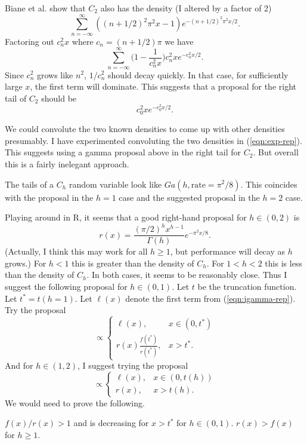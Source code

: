 \documentclass[12pt]{article}
\begin{document}
Biane et al. show that $C_2$ also has the density (I altered by a factor of 2)
\[
\sum_{n=-\infty}^{\infty} ((n+1/2)^2 \pi^2 x - 1) e^{-(n+1/2)^2
  \pi^2 x / 2}.
\]
Factoring out $c_n^2 x$ where $c_n = (n+1/2) \pi$ we have
\[
\sum_{n=-\infty}^\infty \Big( 1 - \frac{1}{c_n^2 x} \Big) c_n^2 x
e^{-c_n^2 x / 2}.
\]
Since $c_n^2$ grows like $n^2$, $1/c_n^2$ should decay quickly.  In that case,
for sufficiently large $x$, the first term will dominate.  This suggests that a
proposal for the right tail of $C_2$ should be
\[
c_0^2 x e^{-c_0^2 x / 2}.
\]

\begin{remark}
  We could convolute the two known densities to come up with other densities
  presumably.  I have experimented convoluting the two densities in
  (\ref{eqn:exp-rep}).  This suggests using a gamma proposal above in the right
  tail for $C_2$.  But overall this is a fairly inelegant approach.
\end{remark}

\begin{conjecture}
  The tails of a $C_h$ random variable look like $Ga(h, \text{rate}=\pi^2 / 8)$.
  This coincides with the proposal in the $h=1$ case and the suggested proposal
  in the $h=2$ case.
\end{conjecture}

Playing around in R, it seems that a good right-hand proposal for $h \in (0,2)$
is
\[
r(x) = \frac{(\pi/2)^h x^{h-1}}{\Gamma(h)} e^{-\pi^2 x / 8}.
\]
(Actually, I think this may work for all $h \geq 1$, but performance will decay
as $h$ grows.)  For $h < 1$ this is greater than the density of $C_h$.  For $1 <
h < 2$ this is less than the density of $C_h$.  In both cases, it seems to be
reasonably close.  Thus I suggest the following proposal for $h \in (0,1)$.  Let
$t$ be the truncation function.  Let $t^* = t(h=1)$.  Let $\ell(x)$ denote the
first term from (\ref{eqn:igamma-rep}).  Try the proposal
\[
\propto
\begin{cases}
\ell(x), & x \in (0, t^*) \\
r(x) \frac{f(t^*)}{r(t^*)}, & x > t^*.
\end{cases}
\]
And for $h \in (1,2)$, I suggest trying the proposal
\[
\propto
\begin{cases}
\ell(x), & x \in (0, t(h)) \\
r(x) , & x > t(h).
\end{cases}
\]
We would need to prove the following.

\begin{conjecture}
  $f(x) / r(x) > 1$ and is decreasing for $x > t^*$ for $h \in (0,1)$.  $r(x) >
  f(x)$ for $h \geq 1$.
\end{conjecture}
\end{document}
